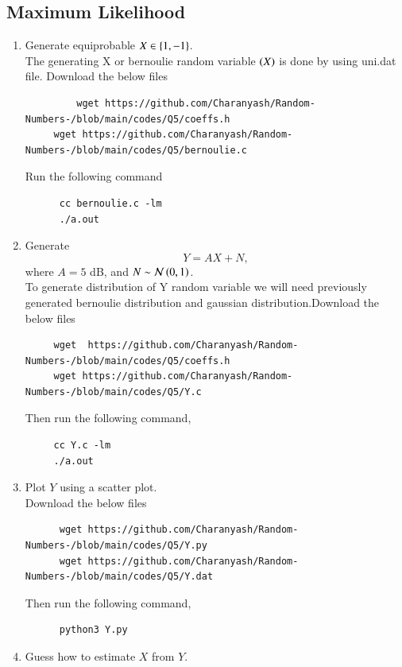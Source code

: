\documentclass[journal,12pt,twocolumn]{IEEEtran}
\renewcommand\thesection{\arabic{section}}
\begin{document}
\begin{enumerate}[label=\thesection.\arabic*,ref=\thesection.\theenumi]
\section{Maximum Likelihood}
\begin{enumerate}[label=\thesection.\arabic*
,ref=\thesection.\theenumi]
\item Generate equiprobable $X \in \left\{1,-1\right\}$.\\	
  \solution The generating X or bernoulie random variable $ \left(X\right)$ is done by using uni.dat file. Download the below files
    \begin{lstlisting}
         wget https://github.com/Charanyash/Random-Numbers-/blob/main/codes/Q5/coeffs.h
	 wget https://github.com/Charanyash/Random-Numbers-/blob/main/codes/Q5/bernoulie.c
    \end{lstlisting}
  Run the following command
    \begin{lstlisting}
	  cc bernoulie.c -lm
	  ./a.out 
    \end{lstlisting} 
\item Generate
\begin{equation}
Y = AX+N,
\end{equation}
	where $A = 5$ dB,  and $N \sim \mathcal{N}\left(0,1\right)$.\\
  \solution To generate distribution of Y random variable we will need previously generated bernoulie distribution and gaussian distribution.Download the below files
    \begin{lstlisting}
     wget  https://github.com/Charanyash/Random-Numbers-/blob/main/codes/Q5/coeffs.h
     wget https://github.com/Charanyash/Random-Numbers-/blob/main/codes/Q5/Y.c
    \end{lstlisting}
   Then run the following command,
    \begin{lstlisting}
     cc Y.c -lm
     ./a.out
    \end{lstlisting}
\item Plot $Y$ using a scatter plot.\\
 \solution Download the below files
    \begin{lstlisting}
      wget https://github.com/Charanyash/Random-Numbers-/blob/main/codes/Q5/Y.py
      wget https://github.com/Charanyash/Random-Numbers-/blob/main/codes/Q5/Y.dat
    \end{lstlisting}
   Then run the following command,
    \begin{lstlisting}
      python3 Y.py
    \end{lstlisting}		
\item Guess how to estimate $X$ from $Y$.

\end{enumerate}
\end{enumerate}
\end{document}
